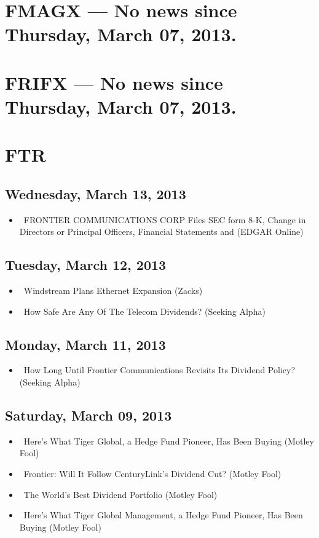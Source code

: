 \documentclass[11pt,asymmetric]{article}
\begin{document}
\section*{FMAGX --- No news since Thursday, March 07, 2013.}


\section*{FRIFX --- No news since Thursday, March 07, 2013.}


\section*{FTR}

\subsection*{Wednesday, March 13, 2013}
\begin{itemize}
\item\ FRONTIER COMMUNICATIONS CORP Files SEC form 8-K, Change in Directors or Principal Officers, Financial Statements and (EDGAR Online)
\end{itemize}
\subsection*{Tuesday, March 12, 2013}
\begin{itemize}
\item\ Windstream Plans Ethernet Expansion (Zacks)
\item\ How Safe Are Any Of The Telecom Dividends? (Seeking Alpha)
\end{itemize}
\subsection*{Monday, March 11, 2013}
\begin{itemize}
\item\ How Long Until Frontier Communications Revisits Its Dividend Policy? (Seeking Alpha)
\end{itemize}
\subsection*{Saturday, March 09, 2013}
\begin{itemize}
\item\ Here's What Tiger Global, a Hedge Fund Pioneer, Has Been Buying (Motley Fool)
\item\ Frontier: Will It Follow CenturyLink's Dividend Cut? (Motley Fool)
\item\ The World's Best Dividend Portfolio (Motley Fool)
\item\ Here's What Tiger Global Management, a Hedge Fund Pioneer, Has Been Buying (Motley Fool)
\end{itemize}
\end{document}
